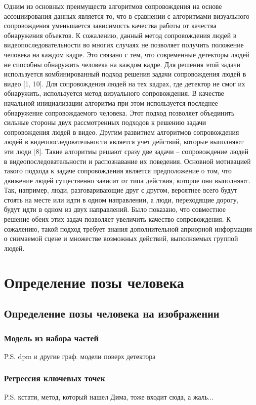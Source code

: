 Одним из основных преимуществ алгоритмов сопровождения на основе ассоциирования данных является то, что в сравнении с алгоритмами визуального сопровождения уменьшается зависимость качества работы от качества обнаружения объектов. К сожалению, данный метод сопровождения людей в видеопоследовательности во многих случаях не позволяет получить положение человека на каждом кадре. Это связано с тем, что современные детекторы людей не способны обнаружить человека на каждом кадре.
Для решения этой задачи используется комбинированный подход решения задачи сопровождения людей в видео [1, 10]. Для сопровождения людей на тех кадрах, где детектор не смог их обнаружить, используется метод визуального сопровождения. В качестве начальной инициализации алгоритма при этом используется последнее обнаружение сопровождаемого человека. Этот подход позволяет объединить сильные стороны двух рассмотренных подходов к решению задачи сопровождения людей в видео.
Другим развитием алгоритмов сопровождения людей в видеопоследовательности является учет действий, которые выполняют эти люди [8]. Такие алгоритмы решают сразу две задачи – сопровождение людей в видеопоследовательности и распознавание их поведения. Основной мотивацией такого подхода к задаче сопровождения является предположение о том, что движение людей существенно зависит от типа действия, которое они выполняют. Так, например, люди, разговаривающие друг с другом, вероятнее всего будут стоять на месте или идти в одном направлении, а люди, переходящие дорогу, будут идти в одном из двух направлений. Было показано, что совместное решение обеих этих задач позволяет увеличить качество сопровождения. К сожалению, такой подход требует знания дополнительной априорной информации о снимаемой сцене и множестве возможных действий, выполняемых группой людей.

\section{Определение позы человека}
\subsection{Определение позы человека на изображении}
\subsubsection{Модель из набора частей} P.S. dpm и другие граф. модели поверх детектора
\subsubsection{Регрессия ключевых точек} P.S. кстати, метод, который нашел Дима, тоже входит сюда, а жаль...
